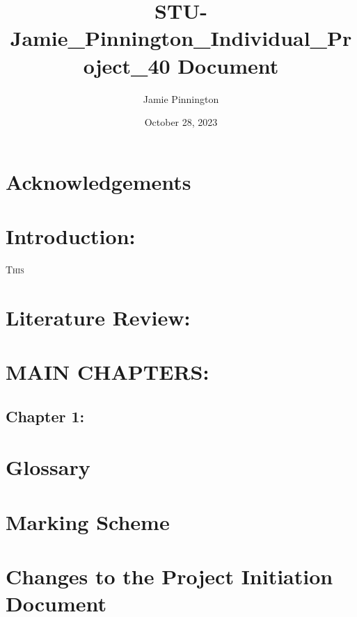\documentclass[preprint,12pt,review,authoryear]{elsarticle}
\title{STU-Jamie_Pinnington_Individual_Project_40 Document}
\author{Jamie Pinnington}
\date{October 28, 2023}
\begin{document}
\pagestyle{customStyle} %



\clearpage %

\begin{abstract}
\end{abstract}

\section*{Acknowledgements}
\clearpage %

\tableofcontents
\clearpage %

\listoffigures
\clearpage %

\listoftables
\clearpage %

\section{Introduction:}

\lettrine[lines=2]{T}{his}

\section{Literature Review:}




\section{MAIN CHAPTERS:}
\subsection{Chapter 1:}

\newpage
\onecolumn
\section{Glossary}
\renewcommand{\thepage}{A\arabic{page}}
\newpage
\section{Marking Scheme}
\renewcommand{\thepage}{B\arabic{page}}
\newpage
\section{Changes to the Project Initiation Document}
\renewcommand{\thepage}{C\arabic{page}}
\newpage
\end{document}
